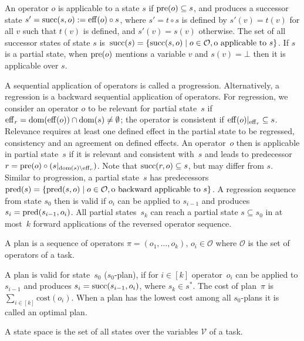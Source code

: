 An operator $o$ is applicable to a state $s$ if $\operatorname{pre}(o) \subseteq s$, and produces a successor state $s'=\operatorname{succ}(s,o):=\operatorname{eff}(o)\circ s$, where $s'=t\circ s$ is defined by $s'(v)=t(v)$ for all $v$ such that $t(v)$ is defined, and $s'(v)=s(v)$ otherwise. The set of all successor states of state $s$ is~$\operatorname{succ}(s)=\{\operatorname{succ}(s,o)\mid o\in \mathcal{O}, \text{o applicable to }s\}$. If $s$ is a partial state, when $\operatorname{pre}(o)$ mentions a variable $v$ and $s(v) = \bot$ then it is applicable over $s$.

A sequential application of operators is called a progression. Alternatively, a regression is a backward sequential application of operators. For regression, we consider an operator $o$ to be relevant for partial state~$s$ if $\operatorname{eff}_r=\operatorname{dom}(\operatorname{eff}(o))\cap\operatorname{dom}(s)\neq\emptyset$; the operator is consistent if $\operatorname{eff}(o)|_{\operatorname{eff}_r} \subseteq s$. Relevance requires at least one defined effect in the partial state to be regressed, consistency and an agreement on defined effects. An operator~$o$ then is  applicable in partial state~$s$ if it is relevant and consistent with~$s$ and leads to predecessor $r=\operatorname{pre}(o)\circ (s|_{\operatorname{dom}(s)\setminus\operatorname{eff}_r})$. Note that $\operatorname{succ}(r,o)\subseteq s$, but may differ from $s$. Similar to progression, a partial state~$s$ has predecessors $\operatorname{pred}(s)=\{\operatorname{pred}(s,o)\mid o\in \mathcal{O}, \text{o backward applicable to }s\}$. A regression sequence from state $s_0$ then is valid if $o_i$ can be applied to $s_{i-1}$ and produces $s_i=\operatorname{pred}(s_{i-1},o_i)$. All partial states~$s_k$ can reach a partial state $s\subseteq s_0$ in at most~$k$ forward applications of the reversed operator sequence.

\begin{definition}[Plan]\label{def:plan}
    A plan is a sequence of operators $\pi=(o_1,\ldots,o_k)$, $o_i\in \mathcal{O}$ where $\mathcal{O}$ is the set of operators of a task.
\end{definition}

A plan is valid for state~$s_0$ ($s_0$-plan), if for $i\in[k]$ operator~$o_i$ can be applied to $s_{i-1}$ and produces $s_i=\operatorname{succ}(s_{i-1},o_i)$, where $s_k \in s^*$. The cost of plan~$\pi$ is $\sum_{i\in[k]} \text{cost}(o_i)$. When a plan has the lowest cost among all $s_0$-plans it is called an optimal plan.

\begin{definition}\label{def:statespace}
    A state space is the set of all states over the variables $\mathcal{V}$ of a task.
\end{definition}

